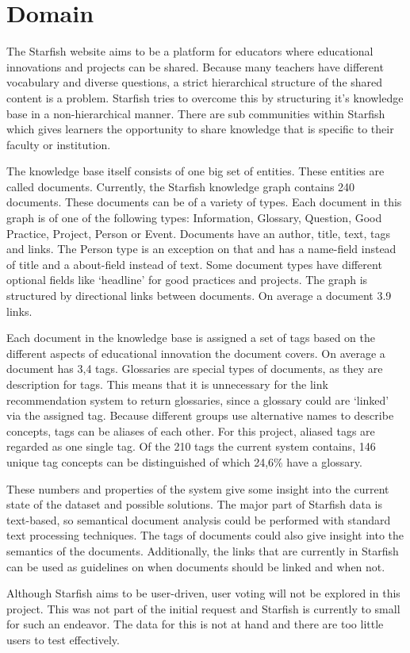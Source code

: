 

\section{Domain}
The Starfish website aims to be a platform for educators where educational innovations and projects can be shared. Because many teachers have different vocabulary and diverse questions, a strict hierarchical structure of the shared content is a problem. Starfish tries to overcome this by structuring it's knowledge base in a non-hierarchical manner. There are sub communities within Starfish which gives learners the opportunity to share knowledge that is specific to their faculty or institution. 

The knowledge base itself consists of one big set of entities. These entities are called documents. Currently, the Starfish knowledge graph contains 240 documents. These documents can be of a variety of types. Each document in this graph is of one of the following types: Information, Glossary, Question, Good Practice, Project, Person or Event. Documents have an author, title, text, tags and links. The Person type is an exception on that and has a name-field instead of title and a about-field instead of text. Some document types have different optional fields like `headline' for good practices and projects. The graph is structured by directional links between documents.  On average a document 3.9 links.

Each document in the knowledge base is assigned a set of tags based on the different aspects of educational innovation the document covers. On average a document has 3,4 tags. Glossaries are special types of documents, as they are description for tags. This means that it is unnecessary for the link recommendation system to return glossaries, since a glossary could are `linked' via the assigned tag. Because different groups use alternative names to describe concepts, tags can be aliases of each other. For this project, aliased tags are regarded as one single tag. Of the 210 tags the current system contains, 146 unique tag concepts can be distinguished of which 24,6\% have a glossary. 

These numbers and properties of the system give some insight into the current
state of the dataset and possible solutions. The major part of Starfish data is
text-based, so semantical document analysis could be performed with standard
text processing techniques. The tags of documents could also give insight into
the semantics of the documents. Additionally, the links that are currently in
Starfish can be used as guidelines on when documents should be linked and when
not. 

Although Starfish aims to be user-driven, user voting will not be explored in this 
project. This was not part of the initial request and Starfish is currently to small 
for such an endeavor. The data for this is not at hand and there are too little
users to test effectively. 
